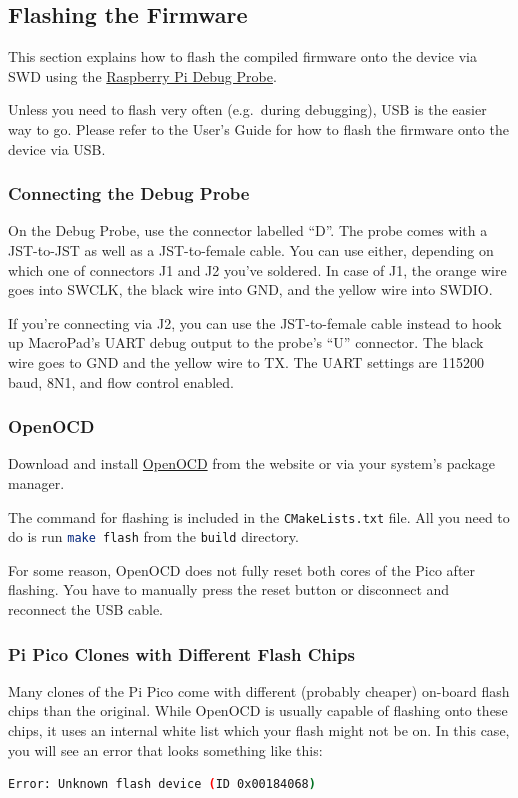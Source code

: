 \documentclass{article}
\newenvironment{note}{\begin{tcolorbox}[colback=blue!5!white,colframe=blue!75!black,title=\textbf{Note}]}{\end{tcolorbox}}
\newcommand{\file}[1]{\texttt{#1}}
\begin{document}
\subsection{Flashing the Firmware}\label{sec:fwflash}
This section explains how to flash the compiled firmware onto the device via SWD using the \href{https://www.raspberrypi.com/documentation/microcontrollers/debug-probe.html}{Raspberry Pi Debug Probe}.

\begin{note}
Unless you need to flash very often (e.g.\ during debugging), USB is the easier way to go.
Please refer to the User's Guide for how to flash the firmware onto the device via USB.
\end{note}

\subsubsection{Connecting the Debug Probe}
On the Debug Probe, use the connector labelled ``D''. The probe comes with a JST-to-JST as well as a JST-to-female cable. You can use either, depending on which one of connectors J1 and J2 you've soldered. In case of J1, the orange wire goes into SWCLK, the black wire into GND, and the yellow wire into SWDIO.

If you're connecting via J2, you can use the JST-to-female cable instead to hook up MacroPad's UART debug output to the probe's ``U'' connector. The black wire goes to GND and the yellow wire to TX.
The UART settings are 115200 baud, 8N1, and flow control enabled. 

\subsubsection{OpenOCD}
Download and install \href{https://openocd.org/}{OpenOCD} from the website or via your system's package manager. 

The command for flashing is included in the \file{CMakeLists.txt} file. All you need to do is run \lstinline[language=bash]{make flash} from the \file{build} directory. 

\begin{note}
For some reason, OpenOCD does not fully reset both cores of the Pico after flashing. You have to manually press the reset button or disconnect and reconnect the USB cable.
\end{note}

\subsubsection{Pi Pico Clones with Different Flash Chips}
Many clones of the Pi Pico come with different (probably cheaper) on-board flash chips than the original.
While OpenOCD is usually capable of flashing onto these chips, it uses an internal white list which your flash might not be on.
In this case, you will see an error that looks something like this:
\begin{lstlisting}[language=bash]
Error: Unknown flash device (ID 0x00184068)
\end{lstlisting}
\end{document}
